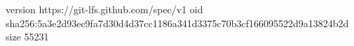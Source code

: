 version https://git-lfs.github.com/spec/v1
oid sha256:5a3e2d93ec9fa7d30d4d37cc1186a341d3375c70b3cf166095522d9a13824b2d
size 55231
